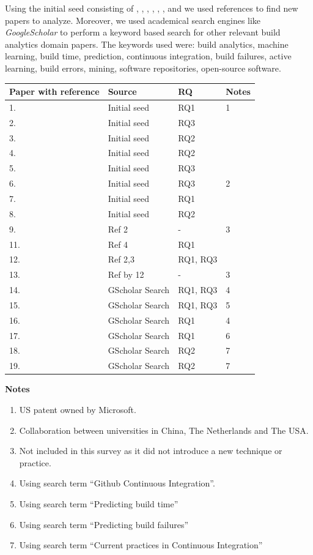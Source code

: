 \documentclass[]{book}
\providecommand{\tightlist}{%
  \setlength{\itemsep}{0pt}\setlength{\parskip}{0pt}}
\begin{document}
Using the initial seed consisting of \citet{bird2017predicting},
\citet{beller2017oops}, \citet{rausch2017empirical},
\citet{beller2017travistorrent}, \citet{pinto2018work},
\citet{zhao2017impact}, \citet{widder2018m} and \citet{hilton2016usage}
we used references to find new papers to analyze. Moreover, we used
academical search engines like \emph{GoogleScholar} to perform a keyword
based search for other relevant build analytics domain papers. The
keywords used were: build analytics, machine learning, build time,
prediction, continuous integration, build failures, active learning,
build errors, mining, software repositories, open-source software.

\begin{longtable}[]{@{}llll@{}}
\toprule
Paper with reference & Source & RQ & Notes\tabularnewline
\midrule
\endhead
1. \citet{bird2017predicting} & Initial seed & RQ1 & 1\tabularnewline
2. \citet{beller2017oops} & Initial seed & RQ3 &\tabularnewline
3. \citet{rausch2017empirical} & Initial seed & RQ2 &\tabularnewline
4. \citet{beller2017travistorrent} & Initial seed & RQ2 &\tabularnewline
5. \citet{pinto2018work} & Initial seed & RQ3 &\tabularnewline
6. \citet{zhao2017impact} & Initial seed & RQ3 & 2\tabularnewline
7. \citet{widder2018m} & Initial seed & RQ1 &\tabularnewline
8. \citet{hilton2016usage} & Initial seed & RQ2 &\tabularnewline
9. \citet{vassallo2017tale} & Ref 2 & - & 3\tabularnewline
11. \citet{hassan2018hirebuild} & Ref 4 & RQ1 &\tabularnewline
12. \citet{vassallo2018break} & Ref 2,3 & RQ1, RQ3 &\tabularnewline
13. \citet{zampetti2017open} & Ref by 12 & - & 3\tabularnewline
14. \citet{baltes2018no} & GScholar Search & RQ1, RQ3 & 4\tabularnewline
15. \citet{bisong2017built} & GScholar Search & RQ1, RQ3 &
5\tabularnewline
16. \citet{santolucito2018statically} & GScholar Search & RQ1 &
4\tabularnewline
17. \citet{ni2018acona} & GScholar Search & RQ1 & 6\tabularnewline
18. \citet{fowler2006continuous} & GScholar Search & RQ2 &
7\tabularnewline
19. \citet{stolberg2009enabling} & GScholar Search & RQ2 &
7\tabularnewline
\bottomrule
\end{longtable}

\textbf{Notes}

\begin{enumerate}
\def\labelenumi{\arabic{enumi}.}
\tightlist
\item
  US patent owned by Microsoft.
\item
  Collaboration between universities in China, The Netherlands and The
  USA.
\item
  Not included in this survey as it did not introduce a new technique or
  practice.
\item
  Using search term ``Github Continuous Integration''.
\item
  Using search term ``Predicting build time''
\item
  Using search term ``Predicting build failures''
\item
  Using search term ``Current practices in Continuous Integration''
\end{enumerate}
\end{document}
